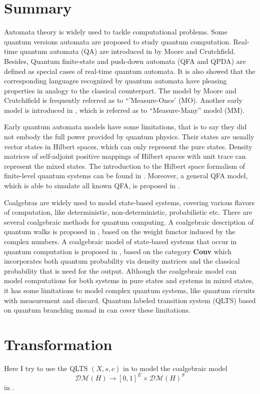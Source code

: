 \documentclass{llncs}
\begin{document}
\section{Summary}
Automata theory is widely used to tackle computational problems. Some
quantum versions automata are proposed to study quantum
computation. Real-time quantum automata (QA) are introduced in
\cite{CJ00} by Moore and Crutchfield. Besides, Quantum finite-state
and push-down automata (QFA and QPDA) are defined as special cases of
real-time quantum automata. It is also showed that the corresponding
languages recognized by quantum automata have pleasing properties in
analogy to the classical counterpart. The model by Moore and
Crutchifield is frequently referred as to ``'Measure-Once'
(MO). Another early model is introduced in \cite{AJ97}, which is
referred as to ``Measure-Many'' model (MM).

Early quantum automata models have some limitations, that is to say
they did not embody the full power provided by quantum physics. Their
states are usually vector states in Hilbert spaces, which can only
represent the pure states. Density matrices of self-adjoint positive
mappings of Hilbert spaces with unit trace can represent the mixed
states. The introduction to the Hilbert space formalism of
finite-level quantum systems can be found in \cite{M11}. Moreover, a
general QFA model, which is able to simulate all known QFA, is
proposed in \cite{AA14}.

Coalgebras are widely used to model state-based systems, covering
various flavors of computation, like deterministic, non-deterministic,
probabilistic etc. There are several coalgebraic methods for quantum
computing. A coalgebraic description of quantum walks is proposed in
\cite{B11}, based on the weight functor induced by the complex
numbers. A coalgebraic model of state-based systems that occur in
quantum computation is proposed in \cite{F12}, based on the category
\textbf{Conv} which incorporates both quantum probability via density
matrices and the classical probability that is need for the
output. Although the coalgebraic model can model computations for both
systems in pure states and systems in mixed states, it has some
limitations to model complex quantum systems, like quantum circuits
with measurement and discard. Quantum labeled transition system (QLTS)
based on quantum branching monad in \cite{H14} can cover these
limitations.

\section{Transformation}
Here I try to use the QLTS $(X,s,c)$ in \cite{H14} to model the
coalgebraic model
$$\mathcal{DM}(H)\rightarrow [0,1]^{E}\times \mathcal{DM}(H)^{S}$$ in
\cite{F12}.
\end{document}
